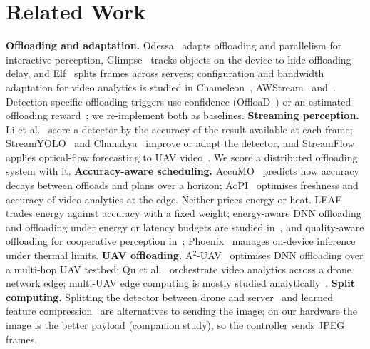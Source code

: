 \documentclass[conference]{IEEEtran}
\begin{document}
\section{Related Work}
\textbf{Offloading and adaptation.} Odessa~\cite{Ra_2011} adapts offloading and parallelism for interactive perception,
Glimpse~\cite{Chen_2015} tracks objects on the device to hide offloading delay, and Elf~\cite{Zhang_2021} splits frames
across servers; configuration and bandwidth adaptation for video analytics is studied in Chameleon~\cite{Jiang_2018},
AWStream~\cite{Zhang_2018} and~\cite{Zhang_2022,Du_2020}.
Detection-specific offloading triggers use confidence (OffloaD~\cite{Gomez_2024}) or an estimated offloading
reward~\cite{Qiu_2024}; we re-implement both as baselines.
\textbf{Streaming perception.} Li et al.~\cite{Li_2020} score a detector by the accuracy of the result available at
each frame; StreamYOLO~\cite{Yang_2022} and Chanakya~\cite{Ghosh_2023} improve or adapt the detector, and StreamFlow
applies optical-flow forecasting to UAV video~\cite{Wang_2025}. We score a distributed offloading system with it.
\textbf{Accuracy-aware scheduling.} AccuMO~\cite{Kong_2023} predicts how accuracy decays between offloads and plans over
a horizon; AoPI~\cite{Li_2024} optimises freshness and accuracy of video analytics at the edge. Neither prices energy
or heat. LEAF~\cite{Wang_2023} trades energy against accuracy with a fixed weight; energy-aware DNN offloading and offloading
under energy or latency budgets are studied in~\cite{Xu_2021,Jiang_2023,Younis_2024}, and quality-aware offloading for
cooperative perception in~\cite{Zaki_2024}; Phoenix~\cite{Jeon_2026} manages on-device inference under thermal limits.
\textbf{UAV offloading.} A$^2$-UAV~\cite{Coletta_2023} optimises DNN offloading over a multi-hop UAV testbed; Qu et al.~\cite{Qu_2024} orchestrate
video analytics across a drone network edge; multi-UAV edge computing is mostly studied analytically~\cite{Sun_2024,Hao_2024}.
\textbf{Split computing.} Splitting the detector between drone and server~\cite{kang2017neurosurgeon,matsubara2022survey}
and learned feature compression~\cite{Matsubara_2022,Furutanpey_2024} are alternatives to sending the image; on our
hardware the image is the better payload (companion study), so the controller sends JPEG frames.
\end{document}
